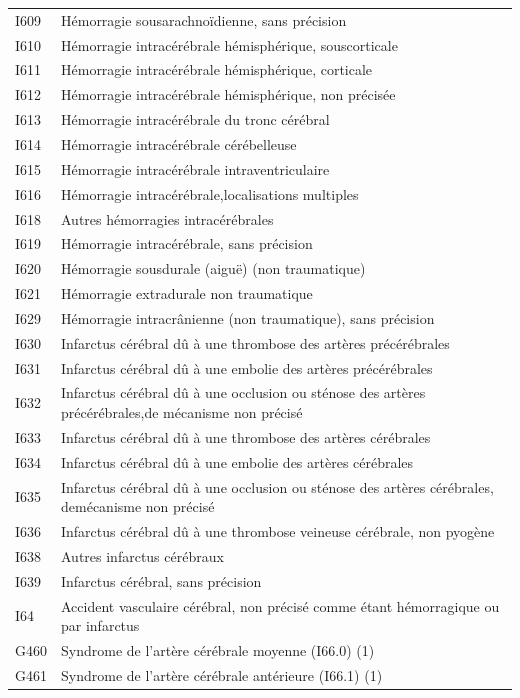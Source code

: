 \documentclass[12pt,english,french,twoside]{book}\usepackage[]{graphicx}\usepackage[]{color}
\begin{document}
{\begin{longtable}{|l|l|}
 I609 & Hémorragie sousarachnoïdienne, sans précision \\
 I610 & Hémorragie intracérébrale hémisphérique, souscorticale \\
 I611 & Hémorragie intracérébrale hémisphérique, corticale \\
 I612 & Hémorragie intracérébrale hémisphérique, non précisée \\
 I613 & Hémorragie intracérébrale du tronc cérébral \\
 I614 & Hémorragie intracérébrale cérébelleuse \\
 I615 & Hémorragie intracérébrale intraventriculaire \\
 I616 & Hémorragie intracérébrale,localisations multiples \\
 I618 & Autres hémorragies intracérébrales \\
 I619 & Hémorragie intracérébrale, sans précision \\
 I620 & Hémorragie sousdurale (aiguë) (non traumatique) \\
 I621 & Hémorragie extradurale non traumatique \\
 I629 & Hémorragie intracrânienne (non traumatique), sans précision \\
 I630 & Infarctus cérébral dû à une thrombose des artères précérébrales \\
 I631 & Infarctus cérébral dû à une embolie des artères précérébrales \\
 I632 & Infarctus cérébral dû à une occlusion ou sténose des artères précérébrales,de mécanisme non précisé \\
 I633 & Infarctus cérébral dû à une thrombose des artères cérébrales \\
 I634 & Infarctus cérébral dû à une embolie des artères cérébrales \\
 I635 & Infarctus cérébral dû à une occlusion ou sténose des artères cérébrales, demécanisme non précisé \\
 I636 & Infarctus cérébral dû à une thrombose veineuse cérébrale, non pyogène \\
 I638 & Autres infarctus cérébraux \\
 I639 & Infarctus cérébral, sans précision \\
 I64 & Accident vasculaire cérébral, non précisé comme étant hémorragique ou par infarctus \\
 G460 & Syndrome de l'artère cérébrale moyenne (I66.0) (1) \\
 G461 & Syndrome de l'artère cérébrale antérieure (I66.1) (1) \\

\end{longtable}}
\end{document}
